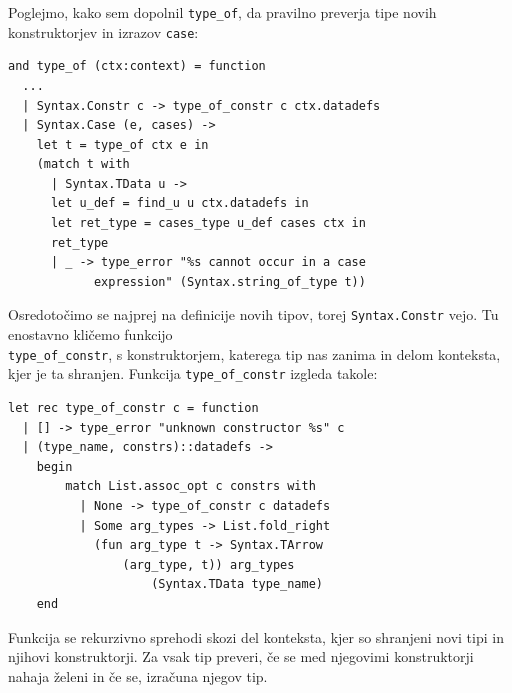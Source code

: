 \documentclass[a4paper,12pt,openright]{book}
\begin{document}
Poglejmo, kako sem dopolnil \lstinline{type_of}, da pravilno preverja tipe novih konstruktorjev in izrazov \lstinline{case}:
\begin{lstlisting}
and type_of (ctx:context) = function
  ...
  | Syntax.Constr c -> type_of_constr c ctx.datadefs
  | Syntax.Case (e, cases) -> 
    let t = type_of ctx e in
    (match t with
      | Syntax.TData u -> 
      let u_def = find_u u ctx.datadefs in
      let ret_type = cases_type u_def cases ctx in
      ret_type
      | _ -> type_error "%s cannot occur in a case 
            expression" (Syntax.string_of_type t))
\end{lstlisting}
Osredotočimo se najprej na definicije novih tipov, torej \lstinline{Syntax.Constr} vejo. Tu enostavno kličemo funkcijo\\ \lstinline{type_of_constr}, s konstruktorjem, katerega tip nas zanima in delom 
konteksta, kjer je ta shranjen. Funkcija \lstinline{type_of_constr} izgleda takole:
\begin{lstlisting}
let rec type_of_constr c = function
  | [] -> type_error "unknown constructor %s" c
  | (type_name, constrs)::datadefs -> 
    begin
        match List.assoc_opt c constrs with
          | None -> type_of_constr c datadefs
          | Some arg_types -> List.fold_right 
            (fun arg_type t -> Syntax.TArrow 
                (arg_type, t)) arg_types 
                    (Syntax.TData type_name) 
    end
\end{lstlisting}
Funkcija se rekurzivno sprehodi skozi del konteksta, kjer so shranjeni novi tipi in njihovi konstruktorji. Za vsak tip preveri, če se med njegovimi konstruktorji nahaja želeni in če se, izračuna 
njegov tip. 
\end{document}
